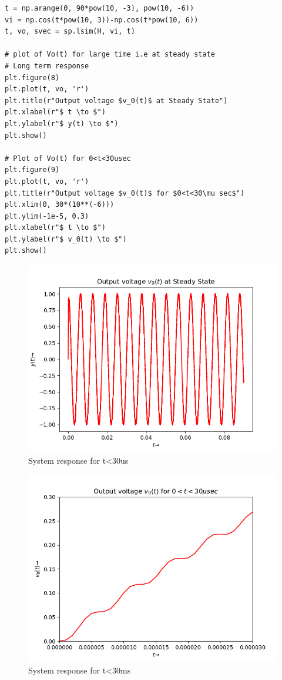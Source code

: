 \documentclass{article}
\begin{document}
\begin{verbatim}
t = np.arange(0, 90*pow(10, -3), pow(10, -6))
vi = np.cos(t*pow(10, 3))-np.cos(t*pow(10, 6))
t, vo, svec = sp.lsim(H, vi, t)

# plot of Vo(t) for large time i.e at steady state
# Long term response
plt.figure(8)
plt.plot(t, vo, 'r')
plt.title(r"Output voltage $v_0(t)$ at Steady State")
plt.xlabel(r"$ t \to $")
plt.ylabel(r"$ y(t) \to $")
plt.show()

# Plot of Vo(t) for 0<t<30usec
plt.figure(9)
plt.plot(t, vo, 'r')
plt.title(r"Output voltage $v_0(t)$ for $0<t<30\mu sec$")
plt.xlim(0, 30*(10**(-6)))
plt.ylim(-1e-5, 0.3)
plt.xlabel(r"$ t \to $")
plt.ylabel(r"$ v_0(t) \to $")
plt.show()
\end{verbatim}



\begin{figure}[h!]
\includegraphics[scale=0.5]{fig12_6.png}
\centering
\caption{System response for t<30us}
\label{fig:Coupled Oscillations}
\end{figure}
\begin{figure}[h!]
\includegraphics[scale=0.5]{fig13_6.png}
\centering
\caption{System response for t<30ms}
\label{fig:Coupled Oscillations}
\end{figure}
\clearpage
\end{document}
